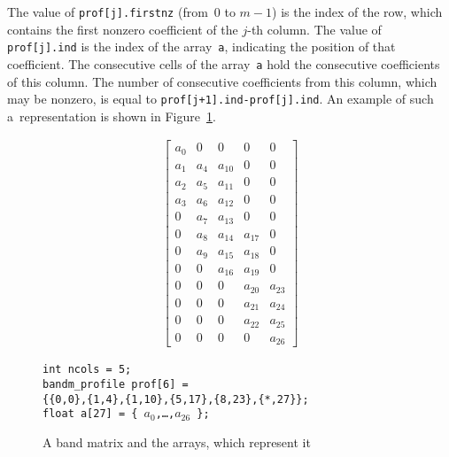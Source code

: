 The value of \texttt{prof[j].firstnz} (from~$0$ to $m-1$) is the index
of the row, which contains the first nonzero coefficient
of the $j$-th column. The value of \texttt{prof[j].ind} is the index of
the array~\texttt{a}, indicating the position of that coefficient.
The consecutive cells of the array~\texttt{a} hold the consecutive
coefficients of this column. The number of consecutive coefficients
from this column, which may be nonzero, is equal to
\texttt{prof[j+1].ind-prof[j].ind}. An example of such
a~representation is shown in Figure~\ref{fig:band:matrix}.
\begin{figure}[ht]
  \begin{minipage}{1.82in}
  \begin{align*}
    \left[\begin{array}{ccccc}
      a_0 &   0 &      0 &      0 &   0    \\
      a_1 & a_4 & a_{10} &      0 &   0    \\
      a_2 & a_5 & a_{11} &      0 &   0    \\
      a_3 & a_6 & a_{12} &      0 &   0    \\
        0 & a_7 & a_{13} &      0 &   0    \\
        0 & a_8 & a_{14} & a_{17} &   0    \\
        0 & a_9 & a_{15} & a_{18} &   0    \\
        0 &   0 & a_{16} & a_{19} &   0    \\
        0 &   0 &      0 & a_{20} & a_{23} \\
        0 &   0 &      0 & a_{21} & a_{24} \\
        0 &   0 &      0 & a_{22} & a_{25} \\
        0 &   0 &      0 &      0 & a_{26}
    \end{array}\right]
  \end{align*}
  \end{minipage}
  \begin{minipage}{3.05in}
    \texttt{int ncols = 5;} \\[10pt]
    \texttt{bandm\_profile prof[6] = \\
     \{\{0,0\},\{1,4\},\{1,10\},\{5,17\},\{8,23\},\{*,27\}\};} \\[10pt]
    \texttt{float a[27] = \{ $a_0$,\ldots,$a_{26}$ \};}
  \end{minipage}
  \caption{\label{fig:band:matrix}A band matrix and the arrays, which represent it}
\end{figure}

